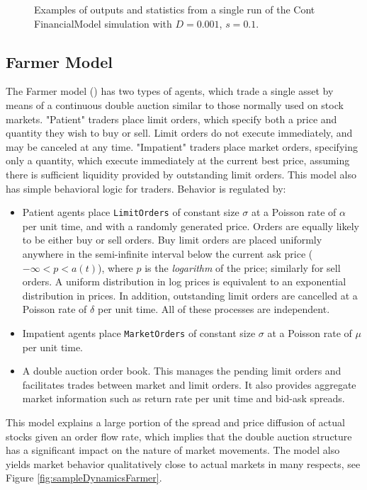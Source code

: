 \documentclass[runningheads]{llncs}
\begin{document}
\begin{figure}[htbp]
\begin{center}
{      }
    \caption{Examples of outputs and statistics from a single run of the Cont FinancialModel simulation with $D=0.001$, $s=0.1$.}
    \label{fig:ContLargeSSim}
  \end{center}
\end{figure}


\subsection{Farmer Model}

The Farmer model (\cite{farmer2003}) has two types of agents, which trade a single asset by means of a continuous double auction similar to those normally used on stock markets. "Patient" traders place limit orders, which specify both a price and quantity they wish to buy or sell. Limit orders do not execute immediately, and may be canceled at any time. "Impatient" traders place market orders, specifying only a quantity, which execute immediately at the current best price, assuming there is sufficient liquidity provided by outstanding limit orders. This model also has simple behavioral logic for traders. Behavior is regulated by:
\begin{itemize}
\item Patient agents place \texttt{LimitOrders} of constant size $\sigma$ at a Poisson rate of $\alpha$ per unit time, and with a randomly generated price. Orders are equally likely to be either buy or sell orders. Buy limit orders are placed uniformly anywhere in the semi-infinite interval below the current ask price ($-\infty < p < a(t)$), where $p$ is the \emph{logarithm} of the price; similarly for sell orders. A uniform distribution in log prices is equivalent to an exponential distribution in prices. In addition, outstanding limit orders are cancelled at a Poisson rate of $\delta$ per unit time. All of these processes are independent.
\item Impatient agents place \texttt{MarketOrders} of constant size $\sigma$ at a Poisson rate of $\mu$ per unit time.
\item A double auction order book. This manages the pending limit orders and facilitates trades between market and limit orders. It also provides aggregate market information such as return rate per unit time and bid-ask spreads.
\end{itemize}
This model explains a large portion of the spread and price diffusion of actual stocks given an order flow rate, which implies that the double auction structure has a significant impact on the nature of market movements. The model also yields market behavior qualitatively close to actual markets in many respects, see Figure \ref{fig:sampleDynamicsFarmer}.
\end{document}
